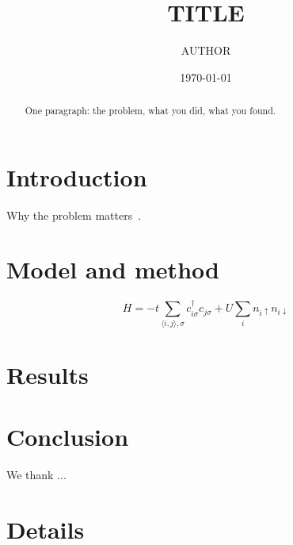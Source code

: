 \documentclass[aps,prb,reprint,superscriptaddress,amsmath,amssymb]{revtex4-2}
\begin{document}
\title{{{TITLE}}}

\author{{{AUTHOR}}}

\date{\today}

\begin{abstract}
One paragraph: the problem, what you did, what you found.
\end{abstract}

\maketitle

\section{Introduction}
Why the problem matters~\cite{hubbard1963,gutzwiller1963}.

\section{Model and method}
\begin{equation}
  H = -t \sum_{\langle i,j \rangle, \sigma} c^\dagger_{i\sigma} c_{j\sigma} + U \sum_i n_{i\uparrow} n_{i\downarrow}
  \label{eq:hamiltonian}
\end{equation}

\section{Results}

\section{Conclusion}

\begin{acknowledgments}
We thank ...
\end{acknowledgments}

\appendix
\section{Details}


\end{document}
